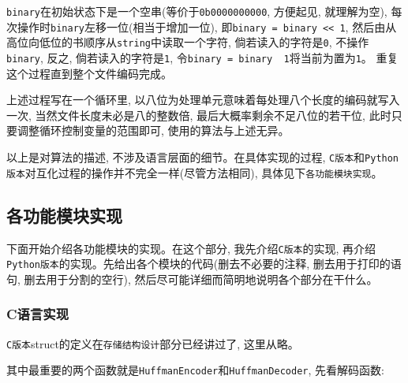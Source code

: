\documentclass[a4paper]{ctexart}
\begin{document}
\texttt{binary}在初始状态下是一个空串(等价于\texttt{0b0000000000}, 方便起见, 就理解为空), 每次操作时\texttt{binary}左移一位(相当于增加一位), 即\texttt{binary\ =\ binary\ \textless{}\textless{}\ 1}, 然后由从高位向低位的书顺序从\texttt{string}中读取一个字符, 倘若读入的字符是\texttt{0}, 不操作\texttt{binary}, 反之, 倘若读入的字符是\texttt{1}, 令\texttt{binary\ =\ binary\ \textbar{}\ 1}将当前为置为\texttt{1}。 重复这个过程直到整个文件编码完成。

上述过程写在一个循环里, 以八位为处理单元意味着每处理八个长度的编码就写入一次, 当然文件长度未必是八的整数倍, 最后大概率剩余不足八位的若干位, 此时只要调整循环控制变量的范围即可, 使用的算法与上述无异。

以上是对算法的描述, 不涉及语言层面的细节。在具体实现的过程, \texttt{C版本}和\texttt{Python版本}对互化过程的操作并不完全一样(尽管方法相同), 具体见下\texttt{各功能模块实现}。

\subsection{各功能模块实现}\label{header-n221}

下面开始介绍各功能模块的实现。在这个部分, 我先介绍\texttt{C版本}的实现, 再介绍\texttt{Python版本}的实现。先给出各个模块的代码(删去不必要的注释, 删去用于打印的语句, 删去用于分割的空行), 然后尽可能详细而简明地说明各个部分在干什么。

\subsubsection{C语言实现}\label{header-n223}

\texttt{C版本}struct的定义在\texttt{存储结构设计}部分已经讲过了, 这里从略。

其中最重要的两个函数就是\texttt{HuffmanEncoder}和\texttt{HuffmanDecoder}, 先看解码函数:
\end{document}
